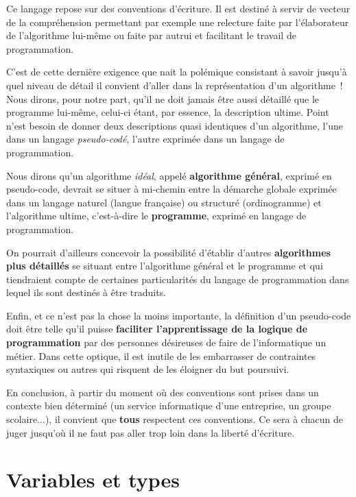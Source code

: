 		Ce langage repose sur des conventions d’écriture. Il est destiné à
		servir de vecteur de la compréhension permettant par exemple une
		relecture faite par l’élaborateur de l’algorithme lui-même ou faite par
		autrui et facilitant le travail de programmation.

		C’est de cette dernière exigence que nait la polémique consistant à
		savoir jusqu’à quel niveau de détail il convient d’aller dans la
		représentation d’un algorithme~! Nous dirons, pour notre part, qu’il ne
		doit jamais être aussi détaillé que le programme lui-même, celui-ci
		étant, par essence, la description ultime. Point n’est besoin de donner
		deux descriptions quasi identiques d’un algorithme, l’une dans un
		langage \textit{pseudo-codé}, l’autre exprimée dans un langage de
		programmation.

		Nous dirons qu’un algorithme \textit{idéal}, appelé \textbf{algorithme
		général}, exprimé en pseudo-code, devrait se situer à mi-chemin entre
		la démarche globale exprimée dans un langage naturel (langue française)
		ou structuré (ordinogramme) et l’algorithme ultime, c’est-à-dire le
		\textbf{programme}, exprimé en langage de programmation.

		On pourrait d’ailleurs concevoir la possibilité d’établir d’autres
		\textbf{algorithmes plus détaillés} se situant entre
		l’algorithme général et le programme et qui tiendraient compte de
		certaines particularités du langage de programmation dans lequel ils
		sont destinés à être traduits.

		Enfin, et ce n’est pas la chose la moins importante, la définition d’un
		pseudo-code doit être telle qu’il puisse \textbf{faciliter
		l’apprentissage de la logique de programmation} par des personnes
		désireuses de faire de l’informatique un métier. Dans cette optique, il
		est inutile de les embarrasser de contraintes syntaxiques ou autres qui
		risquent de les éloigner du but poursuivi.

		En conclusion, à partir du moment où des conventions sont prises dans un
		contexte bien déterminé (un service informatique d’une entreprise, un
		groupe scolaire...), il convient que \textbf{tous} respectent ces
		conventions. Ce sera à chacun de juger jusqu’où il ne faut pas aller
		trop loin dans la liberté d’écriture.

	\section{Variables et types}

